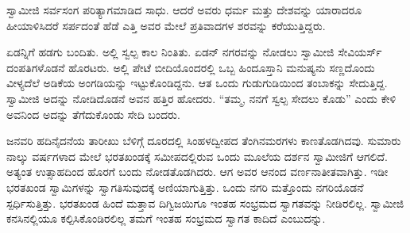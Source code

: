 \newpage

 ಸ್ವಾಮೀಜಿ ಸರ್ವಸಂಗ ಪರಿತ್ಯಾಗಮಾಡಿದ ಸಾಧು. ಆದರೆ ಅವರು ಧರ್ಮ ಮತ್ತು ದೇಶವನ್ನು ಯಾರಾದರೂ ಹೀಯಾಳಿಸಿದರೆ ಸರ್ಪದಂತೆ ಹೆಡೆ ಎತ್ತಿ ಅವರ ಮೇಲೆ ಪ್ರತಿವಾದಗಳ ಶರವನ್ನು ಕರೆಯುತ್ತಿದ್ದರು. 

 ಏಡನ್ನಿಗೆ ಹಡಗು ಬಂದಿತು. ಅಲ್ಲಿ ಸ್ವಲ್ಪ ಕಾಲ ನಿಂತಿತು. ಏಡನ್ ನಗರವನ್ನು ನೋಡಲು ಸ್ವಾಮೀಜಿ ಸೇವಿಯರ್ಸ್ ದಂಪತಿಗಳೊಡನೆ ಹೊರಟರು. ಅಲ್ಲಿ ಪೇಟೆ ಬೀದಿಯೊಂದರಲ್ಲಿ ಒಬ್ಬ ಹಿಂದೂಸ್ತಾನಿ ಮನುಷ್ಯನು ಸಣ್ಣದೊಂದು ವೀಳ್ಯದೆಲೆ ಅಡಿಕೆಯ ಅಂಗಡಿಯನ್ನು ಇಟ್ಟುಕೊಂಡಿದ್ದನು. ಆತ ಒಂದು ಗುಡುಗುಡಿಯಿಂದ ತಂಬಾಕನ್ನು ಸೇದುತ್ತಿದ್ದ. ಸ್ವಾಮೀಜಿ ಅದನ್ನು ನೋಡಿದೊಡನೆ ಅವನ ಹತ್ತಿರ ಹೋದರು. “ತಮ್ಮ, ನನಗೆ ಸ್ವಲ್ಪ ಸೇದಲು ಕೊಡು” ಎಂದು ಕೇಳಿ ಅವನಿಂದ ಅದನ್ನು ತೆಗೆದುಕೊಂಡು ಸೇದಿ ಬಂದರು. 

 ಜನವರಿ ಹದಿನೈದನೆಯ ತಾರೀಖು ಬೆಳಿಗ್ಗೆ ದೂರದಲ್ಲಿ ಸಿಂಹಳದ್ವೀಪದ ತೆಂಗಿನಮರಗಳು ಕಾಣತೊಡಗಿದವು. ಸುಮಾರು ನಾಲ್ಕು ವರ್ಷಗಳಾದ ಮೇಲೆ ಭರತಖಂಡಕ್ಕೆ ಸಮೀಪದಲ್ಲಿರುವ ಒಂದು ಮೂಲೆಯ ದರ್ಶನ ಸ್ವಾಮೀಜಿಗೆ ಆಗಲಿದೆ. ಅತ್ಯಂತ ಉತ್ಸಾಹದಿಂದ ಹೊರಗೆ ಬಂದು ನೋಡತೊಡಗಿದರು. ಆಗ ಅವರ ಆನಂದ ವರ್ಣನಾತೀತವಾಗಿತ್ತು. ಇಡೀ ಭರತಖಂಡ ಸ್ವಾಮಿಗಳನ್ನು ಸ್ವಾಗತಿಸುವುದಕ್ಕೆ ಅಣಿಯಾಗುತ್ತಿತ್ತು. ಒಂದು ನಗರಿ ಮತ್ತೊಂದು ನಗರಿಯೊಡನೆ ಸ್ಪರ್ಧಿಸುತ್ತಿತ್ತು. ಭರತಖಂಡ ಹಿಂದೆ ಮತ್ತಾವ ದಿಗ್ವಿಜಯಿಗೂ ಇಂತಹ ಸಂಭ್ರಮದ ಸ್ವಾಗತವನ್ನು ನೀಡಿರಲಿಲ್ಲ. ಸ್ವಾಮೀಜಿ ಕನಸಿನಲ್ಲಿಯೂ ಕಲ್ಪಿಸಿಕೊಂಡಿರಲಿಲ್ಲ ತಮಗೆ ಇಂತಹ ಸಂಭ್ರಮದ ಸ್ವಾಗತ ಕಾದಿದೆ ಎಂಬುದನ್ನು. 

